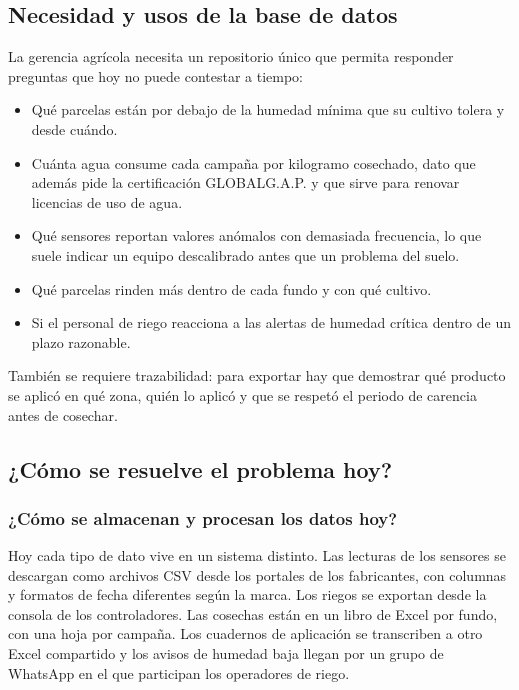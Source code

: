 \documentclass[11pt,letterpaper]{article}
\begin{document}
\subsection{Necesidad y usos de la base de datos}

La gerencia agrícola necesita un repositorio único que permita responder preguntas que hoy no puede contestar a tiempo:

\begin{itemize}[leftmargin=1.4em,itemsep=0.1em]
\item Qué parcelas están por debajo de la humedad mínima que su cultivo tolera y desde cuándo.
\item Cuánta agua consume cada campaña por kilogramo cosechado, dato que además pide la certificación GLOBALG.A.P. y que sirve para renovar licencias de uso de agua.
\item Qué sensores reportan valores anómalos con demasiada frecuencia, lo que suele indicar un equipo descalibrado antes que un problema del suelo.
\item Qué parcelas rinden más dentro de cada fundo y con qué cultivo.
\item Si el personal de riego reacciona a las alertas de humedad crítica dentro de un plazo razonable.
\end{itemize}

También se requiere trazabilidad: para exportar hay que demostrar qué producto se aplicó en qué zona, quién lo aplicó y que se respetó el periodo de carencia antes de cosechar.

\subsection{¿Cómo se resuelve el problema hoy?}

\subsubsection{¿Cómo se almacenan y procesan los datos hoy?}

Hoy cada tipo de dato vive en un sistema distinto. Las lecturas de los sensores se descargan como archivos CSV desde los portales de los fabricantes, con columnas y formatos de fecha diferentes según la marca. Los riegos se exportan desde la consola de los controladores. Las cosechas están en un libro de Excel por fundo, con una hoja por campaña. Los cuadernos de aplicación se transcriben a otro Excel compartido y los avisos de humedad baja llegan por un grupo de WhatsApp en el que participan los operadores de riego.
\end{document}
